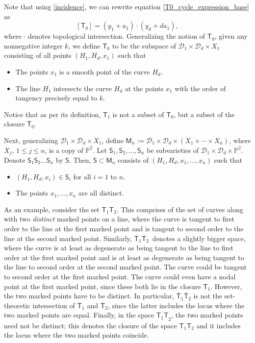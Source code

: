 Note that using \eqref{incidence}, we can rewrite equation \eqref{T0_cycle_expression_base} as
\begin{equation}\label{T0_cycle_expression_base_ag}
[\mathsf{T}_0]  =  (y_1 + a_1)\cdot(y_d + d a_1),
\end{equation}
where $\cdot$ denotes topological intersection. Generalizing the notion of
$\mathsf{T}_0$, given any nonnegative integer $k$, we define $\mathsf{T}_k$
to be the subspace of $\mathcal{D}_1 \times \mathcal{D}_d\times X_1$
consisting of all points $(H_1, H_d, x_1)$ such that
\begin{itemize}\itemsep=0pt
\item The points $x_1$ is a smooth point of the curve $H_d$.
\item The line $H_1$
intersects the curve $H_d$ at the points $x_1$
with the order of tangency precisely equal to $k$.
\end{itemize}
Notice that as per its definition, $\mathsf{T}_1$ is not a subset of $\mathsf{T}_0$, but a subset of the
closure $\overline{\mathsf{T}}_0$.

Next, generalizing $\mathcal{D}_1 \times \mathcal{D}_d \times X_1$, define
$
\mathsf{M}_n :=  \mathcal{D}_1 \times \mathcal{D}_d \times (X_1\times \cdots\times X_n)$,
where $X_j$, $1 \leq j \leq n$, is a copy of $\mathbb{P}^2$.
Let $\mathsf{S}_1, \mathsf{S}_2, \dots, \mathsf{S}_n$ be subvarieties of
$\mathcal{D}_1 \times \mathcal{D}_d \times \mathbb{P}^2$.
Denote $\mathsf{S}_1 \mathsf{S}_2 \dots \mathsf{S}_n$ by $\mathsf{S}$. Then,
$\mathsf{S} \subset \mathsf{M}_n$
consists of
$(H_1, H_d, x_1,\dots, x_n)$ such that
\begin{itemize}\itemsep=0pt
\item $(H_1, H_d, x_i) \in \mathsf{S}_i$ for all $i=1$ to $n$.
\item The points $x_1,\dots, x_n$ are all distinct.
\end{itemize}
As an example, consider the set $\mathsf{T}_1 \mathsf{T}_2$. This comprises of the set of
curves along with two \textit{distinct} marked points on a line, where the curve is tangent to first order to
the line at the first marked point and is tangent to second order to the line at the
second marked point.
Similarly, $\overline{\mathsf{T}}_1 \overline{\mathsf{T}}_2$~denotes a slightly bigger space, where the curve is
at least as degenerate as being tangent to the line to first order at the first marked
point and is at least
as degenerate as being tangent to the line to second order at the second marked point.
The curve could be tangent to second order at the first marked point. The curve could even have a nodal
point at the first marked point, since these both lie in the closure $\mathsf{T}_1$.
However, the two marked points have to be distinct.
In particular, $\overline{\mathsf{T}}_1 \overline{\mathsf{T}}_2$
is not the set-theoretic intersection of
$\overline{\mathsf{T}}_1$ and $\overline{\mathsf{T}}_2$, since the latter
includes the locus where the two marked points are equal.
Finally, in the space
$\overline{\mathsf{T}_1 \mathsf{T}}_2$, the two marked points need not be distinct; this denotes the
closure of the space $\mathsf{T}_1 \mathsf{T}_2$ and it includes the locus where the two marked points coincide.

